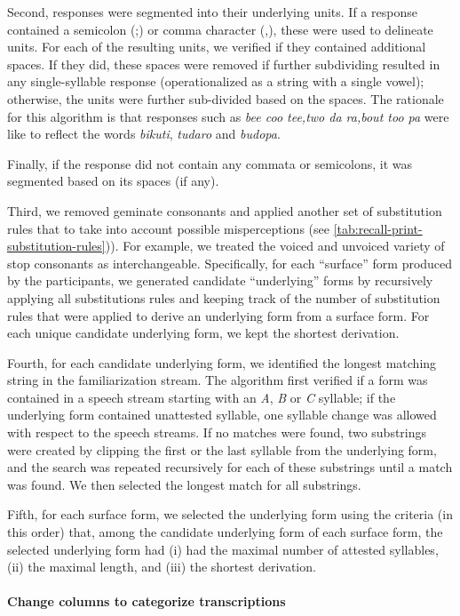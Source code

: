 \documentclass[]{article}
\let\oldparagraph\paragraph
\renewcommand{\paragraph}[1]{\oldparagraph{#1}\mbox{}}
\begin{document}
Second, responses were segmented into their underlying units. If a
response contained a semicolon (;) or comma character (,), these were
used to delineate units. For each of the resulting units, we verified if
they contained additional spaces. If they did, these spaces were removed
if further subdividing resulted in any single-syllable response
(operationalized as a string with a single vowel); otherwise, the units
were further sub-divided based on the spaces. The rationale for this
algorithm is that responses such as \emph{bee coo tee,two da ra,bout too
pa} were like to reflect the words \emph{bikuti}, \emph{tudaro} and
\emph{budopa}.

Finally, if the response did not contain any commata or semicolons, it
was segmented based on its spaces (if any).

Third, we removed geminate consonants and applied another set of
substitution rules that to take into account possible misperceptions
(see \ref{tab:recall-print-substitution-rules})). For example, we
treated the voiced and unvoiced variety of stop consonants as
interchangeable. Specifically, for each ``surface'' form produced by the
participants, we generated candidate ``underlying'' forms by recursively
applying all substitutions rules and keeping track of the number of
substitution rules that were applied to derive an underlying form from a
surface form. For each unique candidate underlying form, we kept the
shortest derivation.

Fourth, for each candidate underlying form, we identified the longest
matching string in the familiarization stream. The algorithm first
verified if a form was contained in a speech stream starting with an
\emph{A}, \emph{B} or \emph{C} syllable; if the underlying form
contained unattested syllable, one syllable change was allowed with
respect to the speech streams. If no matches were found, two substrings
were created by clipping the first or the last syllable from the
underlying form, and the search was repeated recursively for each of
these substrings until a match was found. We then selected the longest
match for all substrings.

Fifth, for each surface form, we selected the underlying form using the
criteria (in this order) that, among the candidate underlying form of
each surface form, the selected underlying form had (i) had the maximal
number of attested syllables, (ii) the maximal length, and (iii) the
shortest derivation.

\paragraph{Change columns to categorize
transcriptions}\label{change-columns-to-categorize-transcriptions}
\end{document}

